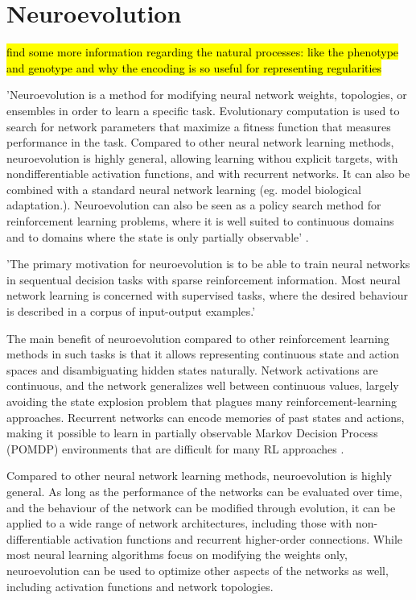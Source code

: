 \section{Neuroevolution}

\hl{find some more information regarding the natural processes: like the phenotype and genotype and why the encoding is so useful for representing regularities}

'Neuroevolution is a method for modifying neural network weights, topologies, or ensembles in order to learn a specific task. Evolutionary computation is used to search for network parameters that maximize a fitness function that measures performance in the task. Compared to other neural network learning methods, neuroevolution is highly general, allowing learning withou explicit targets, with nondifferentiable activation functions, and with recurrent networks. It can also be combined with a standard neural network learning (eg. model biological adaptation.). Neuroevolution can also be seen as a policy search method for reinforcement learning problems, where it is well suited to continuous domains and to domains where the state is only partially observable' \cite{Miikkulainen2010}.

'The primary motivation for neuroevolution is to be able to train neural networks in sequentual decision tasks with sparse reinforcement information. Most neural network learning is concerned with supervised tasks, where the desired behaviour is described in a corpus of input-output examples.' \cite{Miikkulainen2010}

The main benefit of neuroevolution compared to other reinforcement learning methods in such tasks is that it allows representing continuous state and action spaces and disambiguating hidden states naturally.
Network activations are continuous, and the network generalizes well between continuous values, largely avoiding the state explosion problem that plagues many reinforcement-learning approaches. Recurrent networks can encode memories of past states and actions, making it possible to learn in partially observable Markov Decision Process (POMDP) environments that are difficult for many RL approaches \cite{Miikkulainen2010}.

Compared to other neural network learning methods, neuroevolution is highly general. As long as the performance of the networks can be evaluated over time, and the behaviour of the network can be modified through evolution, it can be applied to a wide range of network architectures, including those with non-differentiable activation functions and recurrent  higher-order connections. While most neural learning algorithms focus on modifying the weights only, neuroevolution can be used to optimize other aspects of the networks as well, including activation functions and network topologies.

